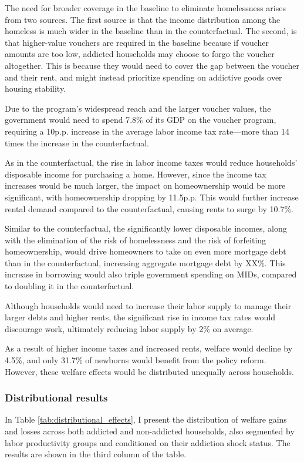 \documentclass[parskip=full]{article}
\begin{document}
The need for broader coverage in the baseline to eliminate homelessness arises from two sources. The first source is that the income distribution among the homeless is much wider in the baseline than in the counterfactual. The second, is that higher-value vouchers are required in the baseline because if voucher amounts are too low, addicted households may choose to forgo the voucher altogether. This is because they would need to cover the gap between the voucher and their rent, and might instead prioritize spending on addictive goods over housing stability.

Due to the program's widespread reach and the larger voucher values, the government would need to spend 7.8\% of its GDP on the voucher program, requiring a 10p.p. increase in the average labor income tax rate—more than 14 times the increase in the counterfactual.

As in the counterfactual, the rise in labor income taxes would reduce households' disposable income for purchasing a home. However, since the income tax increases would be much larger, the impact on homeownership would be more significant, with homeownership dropping by 11.5p.p. This would further increase rental demand compared to the counterfactual, causing rents to surge by 10.7\%.

Similar to the counterfactual, the significantly lower disposable incomes, along with the elimination of the risk of homelessness and the risk of forfeiting homeownership, would drive homeowners to take on even more mortgage debt than in the counterfactual, increasing aggregate mortgage debt by XX\%. This increase in borrowing would also triple government spending on MIDs, compared to doubling it in the counterfactual.

Although households would need to increase their labor supply to manage their larger debts and higher rents, the significant rise in income tax rates would discourage work, ultimately reducing labor supply by 2\% on average.

As a result of higher income taxes and increased rents, welfare would decline by 4.5\%, and only 31.7\% of newborns would benefit from the policy reform. However, these welfare effects would be distributed unequally across households.

\subsubsection{Distributional results}

In Table \ref{tab:distributional_effects}, I present the distribution of welfare gains and losses across both addicted and non-addicted households, also segmented by labor productivity groups and conditioned on their addiction shock status. The results are shown in the third column of the table.
\end{document}
